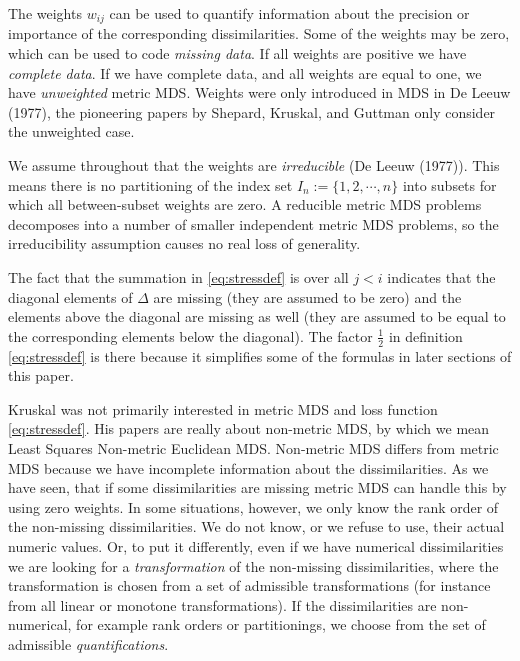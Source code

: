 \documentclass[
  12pt,
]{article}
\begin{document}
The weights \(w_{ij}\) can be used to quantify information about the
precision or importance of the corresponding dissimilarities. Some of the weights may be zero, which can be used to code \emph{missing data}. If all weights are positive we have \emph{complete data}. If we have complete data, and all weights are equal to one, we have \emph{unweighted} metric MDS. Weights were only introduced in MDS in De Leeuw (1977), the pioneering papers by Shepard, Kruskal, and Guttman only consider the unweighted case.

We assume
throughout that the weights are \emph{irreducible} (De Leeuw (1977)). This means there
is no partitioning of the index set \(I_n:=\{1,2,\cdots,n\}\)
into subsets for which all between-subset weights are zero. A reducible
metric MDS problems decomposes into a number of smaller independent
metric MDS problems, so the irreducibility assumption causes no real
loss of generality.

The fact that the summation in \eqref{eq:stressdef} is over all \(j<i\)
indicates that the diagonal elements of \(\Delta\) are missing (they are
assumed to be zero) and the elements above the diagonal are missing as
well (they are assumed to be equal to the corresponding elements below
the diagonal). The factor \(\frac12\) in definition
\eqref{eq:stressdef} is there because it simplifies some of the formulas in
later sections of this paper.

Kruskal was not primarily interested in
metric MDS and loss function \eqref{eq:stressdef}. His papers are really about
non-metric MDS, by which we mean Least Squares Non-metric Euclidean MDS. Non-metric MDS differs
from metric MDS because we have incomplete information about the
dissimilarities. As we have seen, that if some dissimilarities are missing
metric MDS can handle this by using zero weights. In some situations, however,
we only know the rank order of the non-missing dissimilarities.
We do not know, or we refuse to use,
their actual numeric values. Or, to put it differently, even if we have numerical dissimilarities we are looking
for a \emph{transformation} of the non-missing dissimilarities, where the transformation
is chosen from a set of admissible transformations (for instance
from all linear or monotone transformations). If the dissimilarities
are non-numerical, for example rank orders or partitionings, we
choose from the set of admissible \emph{quantifications}.
\end{document}
